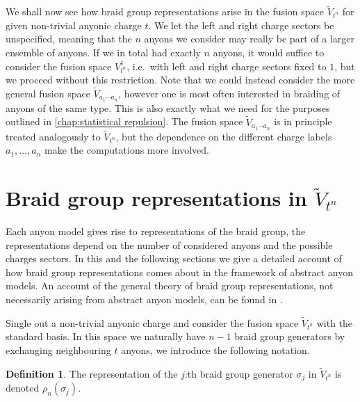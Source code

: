 \documentclass[a4paper,10pt,oneside]{book}
\theoremstyle{plain}
\theoremstyle{definition}
\newtheorem{definition}{Definition}[section]
\theoremstyle{remark}
\begin{document}
We shall now see how braid group representations arise in the fusion space $\widetilde{V}_{t^n}$ for given non-trivial anyonic charge $t$. We let the left and right charge sectors be unspecified, meaning that the $n$ anyons we consider may really be part of a larger ensemble of anyons. If we in total had exactly $n$ anyons, it would suffice to consider the fusion space $V_{t^n}^1$, i.e.\ with left and right charge sectors fixed to $1$, but we proceed without this restriction. Note that we could instead consider the more general fusion space $\widetilde{V}_{a_1 \cdots a_n}$, however one is most often interested in braiding of anyons of the same type. This is also exactly what we need for the purposes outlined in \cref{chap:statistical repulsion}. The fusion space $\widetilde{V}_{a_1 \cdots a_n}$ is in principle treated analogously to $\widetilde{V}_{t^n}$, but the dependence on the different charge labels $a_1, \ldots, a_n$ make the computations more involved.






















\section{Braid group representations in \texorpdfstring{$\widetilde{V}_{t^n}$}{V\~\_(τⁿ)}}\label{sec:anyonic braid representations in fusion space}

Each anyon model gives rise to representations of the braid group, the representations depend on the number of considered anyons and the possible charges sectors. In this and the following sections we give a detailed account of how braid group representations comes about in the framework of abstract anyon models. An account of the general theory of braid group representations, not necessarily arising from abstract anyon models, can be found in \cite{oskar}.

Single out a non-trivial anyonic charge and consider the fusion space $\widetilde{V}_{t^n}$ with the standard basis. In this space we naturally have $n-1$ braid group generators by exchanging neighbouring $t$ anyons, we introduce the following notation.

\begin{definition}\label{def:rho_n sigma_j}
  The representation of the $j$:th braid group generator $σ_j$ in $\widetilde{V}_{t^n}$ is denoted $ρ_n(σ_j)$.
\end{definition}
\end{document}
